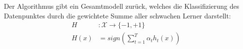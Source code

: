 Der Algorithmus gibt ein Gesamtmodell zurück, welches die Klassifizierung des Datenpunktes durch die gewichtete
Summe aller schwachen Lerner darstellt:
\begin{align*}
    H    & :      \mathcal{X} \rightarrow \{-1, +1\}      \\
    H(x) & =  sign\left(\sum_{t=1}^T\alpha_th_t(x)\right)
\end{align*}